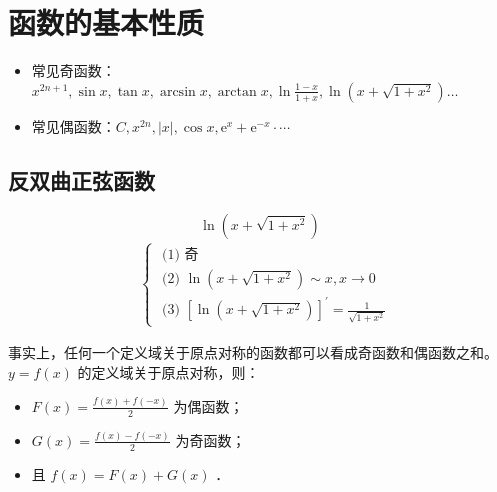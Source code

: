 \section{函数的基本性质}

\begin{theorem}[常见的奇偶函数]
    \begin{itemize}
        \item     常见奇函数：$x^{2 n+1}, \sin x, \tan x, \arcsin x, \arctan x, \ln \frac{1-x}{1+x}, \ln \left(x+\sqrt{1+x^2}\right) \ldots$
        \item     常见偶函数：$C, x^{2 n},|x|, \cos x, \mathrm{e}^x+\mathrm{e}^{-x} \cdot \cdots$
    \end{itemize}
\end{theorem}

\subsection{反双曲正弦函数}

\begin{theorem}[反双曲正弦函数]
    $$\ln \left(x+\sqrt{1+x^2}\right)$$
    $$
        \begin{aligned}
             & \left\{\begin{array}{l}
                          \text { (1) 奇 }                                                       \\
                          \text { (2) } \ln \left(x+\sqrt{1+x^2}\right) \sim x, x \rightarrow 0 \\
                          \text { (3) }\left[\ln \left(x+\sqrt{1+x^2}\right)\right]^{\prime}=\frac{1}{\sqrt{1+x^2}}
                      \end{array}\right.
        \end{aligned}
    $$
\end{theorem}

\begin{theorem}
    事实上，任何一个定义域关于原点对称的函数都可以看成奇函数和偶函数之和。$y=f(x)$ 的定义域关于原点对称，则：
    \begin{itemize}
        \item $F(x)=\frac{f(x)+f(-x)}{2}$ 为偶函数；
        \item $G(x)=\frac{f(x)-f(-x)}{2}$ 为奇函数；
        \item 且 $f(x)=F(x)+G(x)$ ．
    \end{itemize}
\end{theorem}


